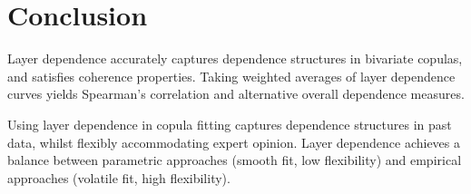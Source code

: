 \documentclass[authoryear]{elsarticle}
\begin{document}
\section{Conclusion}\label{sconclusion}

Layer dependence accurately captures dependence structures in bivariate copulas, and satisfies coherence properties. Taking weighted averages of layer dependence curves yields Spearman's correlation and alternative overall dependence measures.

Using layer dependence in copula fitting captures dependence structures in past data, whilst flexibly accommodating expert opinion. Layer dependence achieves a balance between parametric approaches (smooth fit, low flexibility) and empirical approaches (volatile fit, high flexibility).


\newpage

\newpage


\end{document}
